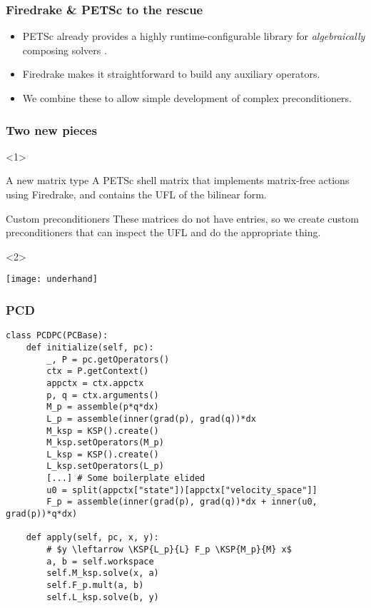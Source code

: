 \documentclass[presentation]{beamer}
\newcommand{\KSP}[2]{\ensuremath{\mathcal{K}\left(#1, \mathbb{#2}\right)}}
\begin{document}
\begin{frame}
  \frametitle{Firedrake \& PETSc to the rescue}
  \begin{itemize}
  \item PETSc already provides a highly runtime-configurable library
    for \emph{algebraically} composing solvers \parencite{Brown:2012}.

  \item Firedrake makes it straightforward to build any auxiliary
    operators.

  \item We combine these to allow simple development of complex
    preconditioners.
  \end{itemize}
\end{frame}
\begin{frame}
  \frametitle{Two new pieces}
 
  \begin{onlyenv}<1>
    \begin{block}{A new matrix type}
      A PETSc shell matrix that implements matrix-free actions using
      Firedrake, and contains the UFL of the bilinear form.
    \end{block}
  
  \begin{block}{Custom preconditioners}
    These matrices do not have entries, so we create custom
    preconditioners that can inspect the UFL and do the appropriate
    thing.
  \end{block}
\end{onlyenv}
\begin{onlyenv}<2>
  \begin{center}
    \texttt{[image: underhand]}
  \end{center}
\end{onlyenv}
\end{frame}


\begin{frame}[fragile]
  \frametitle{PCD}

\begin{verbatim}
class PCDPC(PCBase):
    def initialize(self, pc):
        _, P = pc.getOperators()
        ctx = P.getContext()
        appctx = ctx.appctx
        p, q = ctx.arguments()
        M_p = assemble(p*q*dx)
        L_p = assemble(inner(grad(p), grad(q))*dx
        M_ksp = KSP().create()
        M_ksp.setOperators(M_p)
        L_ksp = KSP().create()
        L_ksp.setOperators(L_p)
        [...] # Some boilerplate elided
        u0 = split(appctx["state"])[appctx["velocity_space"]]
        F_p = assemble(inner(grad(p), grad(q))*dx + inner(u0, grad(p))*q*dx)

    def apply(self, pc, x, y):
        # $y \leftarrow \KSP{L_p}{L} F_p \KSP{M_p}{M} x$
        a, b = self.workspace
        self.M_ksp.solve(x, a)
        self.F_p.mult(a, b)
        self.L_ksp.solve(b, y)
\end{verbatim}
\end{frame}
\end{document}
